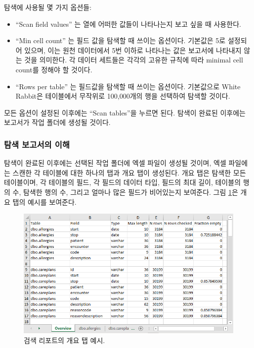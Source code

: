 \documentclass[11pt]{book}
\providecommand{\tightlist}{%
  \setlength{\itemsep}{0pt}\setlength{\parskip}{0pt}}
\theoremstyle{definition}
\theoremstyle{definition}
\theoremstyle{definition}
\theoremstyle{remark}
\begin{document}
탐색에 사용될 몇 가지 옵션들:

\begin{itemize}
\tightlist
\item
  ``Scan field values'' 는 열에 어떠한 값들이 나타나는지 보고 싶을 때
  사용한다.
\item
  ``Min cell count'' 는 필드 값을 탐색할 때 쓰이는 옵션이다. 기본값은
  5로 설정되어 있으며, 이는 원천 데이터에서 5번 이하로 나타나는 값은
  보고서에 나타내지 않는 것을 의미한다. 각 데이터 세트들은 각각의 고유한
  규칙에 따라 minimal cell count를 정해야 할 것이다.
\item
  ``Rows per table'' 는 필드값을 탐색할 때 쓰이는 옵션이다. 기본값으로
  White Rabbit은 테이블에서 무작위로 100,000개의 행을 선택하여 탐색할
  것이다.
\end{itemize}

모든 옵션이 설정된 이후에는 ``Scan tables''을 누르면 된다. 탐색이 완료된
이후에는 보고서가 작업 폴더에 생성될 것이다.

\subsubsection*{탐색 보고서의 이해}\label{--}

탐색이 완료된 이후에는 선택된 작업 폴더에 엑셀 파일이 생성될 것이며,
엑셀 파일에는 스캔한 각 테이블에 대한 하나의 탭과 개요 탭이 생성된다.
개요 탭은 탐색한 모든 테이블이며, 각 테이블의 필드, 각 필드의 데이터
타입, 필드의 최대 길이, 테이블의 행의 수, 탐색한 행의 수, 그리고 얼마나
많은 필드가 비어있는지 보여준다. 그림 \ref{fig:ScanOverviewTab}은 개요
탭의 예시를 보여준다.

\begin{figure}

{\centering \includegraphics[width=1\linewidth]{images/ExtractTransformLoad/ScanOverviewTab} 

}

\caption{검색 리포트의 개요 탭 예시.}\label{fig:ScanOverviewTab}
\end{figure}
\end{document}
